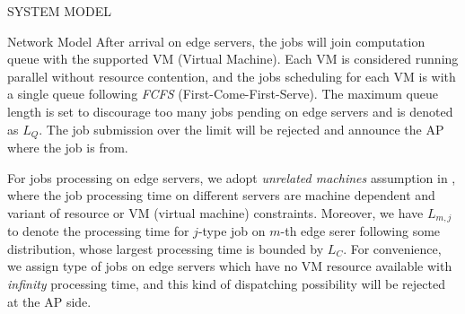 \documentclass[10pt, conference, letterpaper]{IEEEtran}
\begin{document}
\begin{section}{SYSTEM MODEL}
\begin{subsection}{Network Model}
            After arrival on edge servers, the jobs will join computation queue with the supported VM (Virtual Machine).
            Each VM is considered running parallel without resource contention, and the jobs scheduling for each VM is with a single queue following \emph{FCFS} (First-Come-First-Serve).
            {\color{red}The maximum queue length is set to discourage too many jobs pending on edge servers and is denoted as $L_Q$. The job submission over the limit will be rejected and announce the AP where the job is from.}

            For jobs processing on edge servers, we adopt \emph{unrelated machines} assumption in \cite{tan-online}, where the job processing time on different servers are machine dependent and variant of resource or VM (virtual machine) constraints.
            Moreover, we have $L_{m,j}$ to denote the processing time for $j$-type job on $m$-th edge serer following some distribution, whose largest processing time is bounded by $L_C$.
            For convenience, we assign type of jobs on edge servers which have no VM resource available with \emph{infinity} processing time, and this kind of dispatching possibility will be rejected at the AP side.
        \end{subsection}


\end{section}
\end{document}
